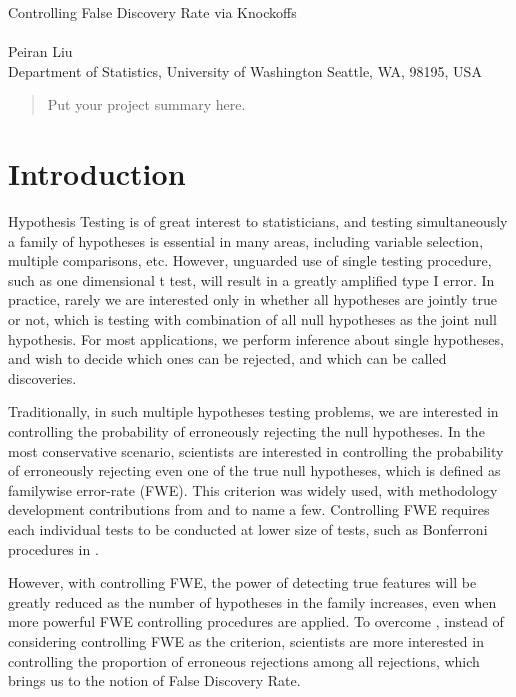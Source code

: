\documentclass{uwstat572}
\begin{document}

\begin{center}
  {\LARGE Controlling False Discovery Rate via Knockoffs}\\\ \\
  {Peiran Liu \\ 
    Department of Statistics, University of Washington Seattle, WA, 98195, USA
  }
\end{center}



\begin{abstract}
  Put your project summary here.
\end{abstract}

\section{Introduction}
Hypothesis Testing is of great interest to statisticians, and testing simultaneously a family of hypotheses is essential in many areas, including variable selection, multiple comparisons, etc. However, unguarded use of single testing procedure, such as one dimensional t test, will result in a greatly amplified type I error. In practice, rarely we are interested only in whether all hypotheses are jointly true or not, which is testing with combination of all null hypotheses as the joint null hypothesis. For most applications, we perform inference about single hypotheses, and wish to decide which ones can be rejected, and which can be called discoveries. 

Traditionally, in such multiple hypotheses testing problems, we are interested in controlling the probability of erroneously rejecting the null hypotheses. In the most conservative scenario, scientists are interested in controlling the probability of erroneously rejecting even one of the true null hypotheses, which is defined as familywise error-rate (FWE). This criterion was widely used, with methodology development contributions from \cite{hochberg2009multiple} and \cite{westfall1993resampling} to name a few. Controlling FWE requires each individual tests to be conducted at lower size of tests, such as Bonferroni procedures in \cite{holm1979simple}. 

However, with controlling FWE, the power of detecting true features will be greatly reduced as the number of hypotheses in the family increases, even when more powerful FWE controlling procedures are applied. To overcome , instead of considering controlling FWE as the criterion, scientists are more interested in controlling the proportion of erroneous rejections among all rejections, which brings us to the notion of False Discovery Rate.
\end{document}

